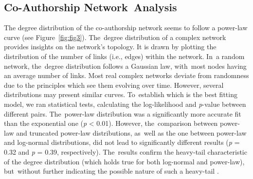 \documentclass[jmse,review,accept,pdftex,moreauthors]{Definitions/mdpi}
\begin{document}
\subsection{Co-Authorship Network~Analysis}
The degree distribution of the co-authorship network seems to follow a power-law curve (see Figure~\ref{fig:fig3}). The~degree distribution of a complex network provides insights on the network's topology. It is drawn by plotting the distribution of the number of links (i.e., edges) within the network. In~a random network, the~degree distribution follows a Gaussian law, with~most nodes having an average number of links. Most real complex networks deviate from randomness due to the principles which see them evolving over time. However, several distributions may present similar curves. To~establish which is the best fitting model, we ran statistical tests, calculating the log-likelihood and \emph{p}-value between different pairs. The~power-law distribution was a significantly more accurate fit than the exponential one (\emph{p} {\textless} 0.01). However, the~comparison between power-law and truncated power-law distributions, as~well as the one between power-law and log-normal distributions, did not lead to significantly different results (\emph{p} = 0.32 and \emph{p} = 0.39, respectively). The~results confirm the heavy-tail characteristic of the degree distribution (which holds true for both log-normal and power-law), but~without further indicating the possible nature of such a heavy-tail \citep{mitzenmacher2004brief,higaki2020co,liu2021structural,smith2021explaining}.
\end{document}
